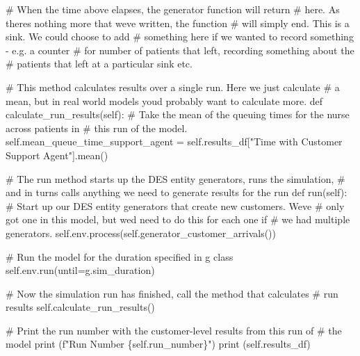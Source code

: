 \documentclass[
  letterpaper,
  DIV=11,
  numbers=noendperiod]{scrreprt}
\newenvironment{Shaded}{\begin{snugshade}}{\end{snugshade}}
\newcommand{\BuiltInTok}[1]{\textcolor[rgb]{0.00,0.23,0.31}{#1}}
\newcommand{\CommentTok}[1]{\textcolor[rgb]{0.37,0.37,0.37}{#1}}
\newcommand{\KeywordTok}[1]{\textcolor[rgb]{0.00,0.23,0.31}{#1}}
\newcommand{\NormalTok}[1]{\textcolor[rgb]{0.00,0.23,0.31}{#1}}
\newcommand{\OperatorTok}[1]{\textcolor[rgb]{0.37,0.37,0.37}{#1}}
\newcommand{\SpecialCharTok}[1]{\textcolor[rgb]{0.37,0.37,0.37}{#1}}
\newcommand{\SpecialStringTok}[1]{\textcolor[rgb]{0.13,0.47,0.30}{#1}}
\newcommand{\StringTok}[1]{\textcolor[rgb]{0.13,0.47,0.30}{#1}}
\newcommand{\VariableTok}[1]{\textcolor[rgb]{0.07,0.07,0.07}{#1}}
\begin{document}
\begin{tcolorbox}
\begin{Shaded}
\begin{Highlighting}[]
            \CommentTok{\# When the time above elapses, the generator function will return}
            \CommentTok{\# here.  As there\textquotesingle{}s nothing more that we\textquotesingle{}ve written, the function}
            \CommentTok{\# will simply end.  This is a sink.  We could choose to add}
            \CommentTok{\# something here if we wanted to record something {-} e.g. a counter}
            \CommentTok{\# for number of patients that left, recording something about the}
            \CommentTok{\# patients that left at a particular sink etc.}

    \CommentTok{\# This method calculates results over a single run.  Here we just calculate}
    \CommentTok{\# a mean, but in real world models you\textquotesingle{}d probably want to calculate more.}
    \KeywordTok{def}\NormalTok{ calculate\_run\_results(}\VariableTok{self}\NormalTok{):}
        \CommentTok{\# Take the mean of the queuing times for the nurse across patients in}
        \CommentTok{\# this run of the model.}
        \VariableTok{self}\NormalTok{.mean\_queue\_time\_support\_agent }\OperatorTok{=} \VariableTok{self}\NormalTok{.results\_df[}\StringTok{"Time with Customer Support Agent"}\NormalTok{].mean()}

    \CommentTok{\# The run method starts up the DES entity generators, runs the simulation,}
    \CommentTok{\# and in turns calls anything we need to generate results for the run}
    \KeywordTok{def}\NormalTok{ run(}\VariableTok{self}\NormalTok{):}
        \CommentTok{\# Start up our DES entity generators that create new customers.  We\textquotesingle{}ve}
        \CommentTok{\# only got one in this model, but we\textquotesingle{}d need to do this for each one if}
        \CommentTok{\# we had multiple generators.}
        \VariableTok{self}\NormalTok{.env.process(}\VariableTok{self}\NormalTok{.generator\_customer\_arrivals())}

        \CommentTok{\# Run the model for the duration specified in g class}
        \VariableTok{self}\NormalTok{.env.run(until}\OperatorTok{=}\NormalTok{g.sim\_duration)}

        \CommentTok{\# Now the simulation run has finished, call the method that calculates}
        \CommentTok{\# run results}
        \VariableTok{self}\NormalTok{.calculate\_run\_results()}

        \CommentTok{\# Print the run number with the customer{-}level results from this run of}
        \CommentTok{\# the model}
        \BuiltInTok{print}\NormalTok{ (}\SpecialStringTok{f"Run Number }\SpecialCharTok{\{}\VariableTok{self}\SpecialCharTok{.}\NormalTok{run\_number}\SpecialCharTok{\}}\SpecialStringTok{"}\NormalTok{)}
        \BuiltInTok{print}\NormalTok{ (}\VariableTok{self}\NormalTok{.results\_df)}
\end{Highlighting}
\end{Shaded}

\end{tcolorbox}
\end{document}
